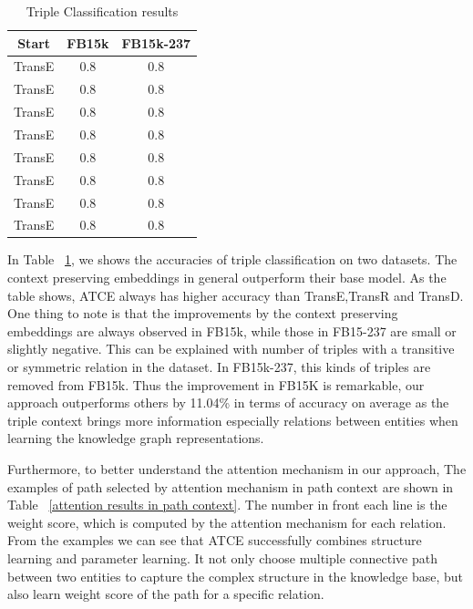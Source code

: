 \begin{table}
 \centering
 \caption{Triple Classification results}
  \label{Triple Classification_results}
\begin{tabular}{c|c|c}
  \hline
  Start & FB15k  & FB15k-237 \\
  \hline
  TransE & 0.8 & 0.8 \\
  TransE & 0.8 & 0.8 \\
  TransE & 0.8 & 0.8 \\
  TransE & 0.8 & 0.8 \\
  TransE & 0.8 & 0.8 \\
  TransE & 0.8 & 0.8 \\
  TransE & 0.8 & 0.8 \\
  TransE & 0.8 & 0.8 \\
  \hline
\end{tabular}
\end{table}
In Table ~\ref{Triple Classification_results}, we shows the accuracies of triple classification on two datasets. The context preserving embeddings in general outperform their base model. As the table shows, ATCE always has higher accuracy than TransE,TransR and TransD. One thing to note is that the improvements by the context preserving embeddings are always observed in FB15k, while those in FB15-237 are small or slightly negative. This can be explained with number of triples with a transitive or symmetric relation in the dataset. In FB15k-237, this kinds of triples are removed from FB15k. Thus the improvement in FB15K is remarkable, our approach outperforms others by 11.04\% in terms of accuracy on average as the triple context brings more information especially relations between entities when learning the knowledge graph representations.

Furthermore, to better understand the attention mechanism in our approach, The examples of path selected by attention mechanism in path context are shown in Table ~\ref{attention results in path context}. The number in front each line is the weight score, which is computed by the attention mechanism for each relation. From the examples we can see that ATCE successfully combines structure learning and parameter learning. It not only choose multiple connective path between two entities to capture the complex structure in the knowledge base, but also learn weight score of the path for a specific relation.

